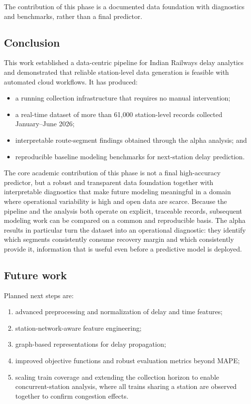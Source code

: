 \documentclass[a4paper,fleqn]{cas-dc}
\begin{document}
The contribution of this phase is a documented data foundation with
diagnostics and benchmarks, rather than a final predictor.

\subsection{Conclusion}
This work established a data-centric pipeline for Indian Railways delay
analytics and demonstrated that reliable station-level data generation is
feasible with automated cloud workflows. It has produced:
\begin{itemize}
    \item a running collection infrastructure that requires no manual
          intervention;
    \item a real-time dataset of more than 61{,}000 station-level records
          collected January--June 2026;
    \item interpretable route-segment findings obtained through the alpha
          analysis; and
    \item reproducible baseline modeling benchmarks for next-station delay
          prediction.
\end{itemize}
The core academic contribution of this phase is not a final high-accuracy
predictor, but a robust and transparent data foundation together with
interpretable diagnostics that make future modeling meaningful in a domain
where operational variability is high and open data are scarce. Because the
pipeline and the analysis both operate on explicit, traceable records,
subsequent modeling work can be compared on a common and reproducible basis.
The alpha results in particular turn the dataset into an operational
diagnostic: they identify which segments consistently consume recovery margin
and which consistently provide it, information that is useful even before a
predictive model is deployed.

\subsection{Future work}
Planned next steps are:
\begin{enumerate}
    \item advanced preprocessing and normalization of delay and time features;
    \item station-network-aware feature engineering;
    \item graph-based representations for delay propagation;
    \item improved objective functions and robust evaluation metrics beyond
          MAPE;
    \item scaling train coverage and extending the collection horizon to
          enable concurrent-station analysis, where all trains sharing a
          station are observed together to confirm congestion effects.
\end{enumerate}
\end{document}
